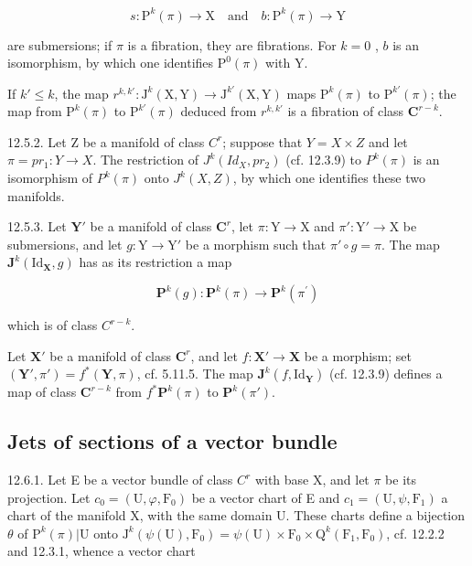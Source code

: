 \[
s \colon \mathrm{P} ^ {k} (\pi) \rightarrow \mathrm{X} \quad \text {and} \quad b \colon \mathrm{P} ^ {k} (\pi) \rightarrow \mathrm{Y}
\]

are submersions; if \(\pi\) is a fibration, they are fibrations. For \(k=0\) , \(b\) is an isomorphism, by which one identifies \(\mathrm{P}^{0}(\pi)\) with Y.

If \(k' \leqslant k\), the map \(r^{k, k'} : \mathrm{J}^k(\mathrm{X}, \mathrm{Y}) \to \mathrm{J}^{k'}(\mathrm{X}, \mathrm{Y})\) maps \(\mathrm{P}^k(\pi)\) to \(\mathrm{P}^{k'}(\pi)\); the map from \(\mathrm{P}^k(\pi)\) to \(\mathrm{P}^{k'}(\pi)\) deduced from \(r^{k, k'}\) is a fibration of class \(\mathbf{C}^{r-k}\).

12.5.2. Let Z be a manifold of class \(C^{r}\); suppose that \(Y = X \times Z\) and let \(\pi = pr_{1}: Y \to X\). The restriction of \(J^{k}(Id_{X}, pr_{2})\) (cf. 12.3.9) to \(P^{k}(\pi)\) is an isomorphism of \(P^{k}(\pi)\) onto \(J^{k}(X, Z)\), by which one identifies these two manifolds.

12.5.3. Let \(\mathbf{Y}'\) be a manifold of class \(\mathbf{C}^{r}\), let \(\pi: \mathrm{Y} \to \mathrm{X}\) and \(\pi': \mathrm{Y}' \to \mathrm{X}\) be submersions, and let \(g: \mathrm{Y} \to \mathrm{Y}'\) be a morphism such that \(\pi' \circ g = \pi\). The map \(\mathbf{J}^{k}(\mathrm{Id}_{\mathbf{X}},g)\) has as its restriction a map

\[
\mathbf {P} ^ {k} (g) \colon \mathbf {P} ^ {k} (\pi) \to \mathbf {P} ^ {k} (\pi^ {\prime})
\]

which is of class \(C^{r-k}\).

Let \(\mathbf{X}'\) be a manifold of class \(\mathbf{C}^r\), and let \(f: \mathbf{X}' \to \mathbf{X}\) be a morphism; set \((\mathbf{Y}', \pi') = f^*(\mathbf{Y}, \pi)\), cf. 5.11.5. The map \(\mathbf{J}^k(f, \mathrm{Id}_\mathbf{Y})\) (cf. 12.3.9) defines a map of class \(\mathbf{C}^{r-k}\) from \(f^*\mathbf{P}^k(\pi)\) to \(\mathbf{P}^k(\pi')\).

\subsection{Jets of sections of a vector bundle}

12.6.1. Let E be a vector bundle of class \(C^{r}\) with base X, and let \(\pi\) be its projection. Let \(c_{0} = (\mathrm{U}, \varphi, \mathrm{F}_{0})\) be a vector chart of E and \(c_{1} = (\mathrm{U}, \psi, \mathrm{F}_{1})\) a chart of the manifold X, with the same domain U. These charts define a bijection \(\theta\) of \(\mathrm{P}^{k}(\pi)|\mathrm{U}\) onto \(\mathrm{J}^{k}(\psi(\mathrm{U}), \mathrm{F}_{0}) = \psi(\mathrm{U}) \times \mathrm{F}_{0} \times \mathrm{Q}^{k}(\mathrm{F}_{1}, \mathrm{F}_{0})\), cf. 12.2.2 and 12.3.1, whence a vector chart

